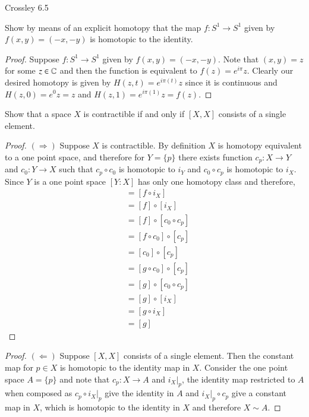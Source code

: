 \documentclass{homework651}
\begin{document}
\begin{problems}
\problem Crossley 6.5

Show by means of an explicit homotopy
that the map $f:S^1\rightarrow S^1$ given by $f(x,y)=(-x,-y)$
is homotopic to the identity.
\begin{proof} Suppose $f:S^1\rightarrow S^1$ given by $f(x,y)=(-x,-y)$. Note that $(x, y) = z$ for some $z \in \mathbb C$ 
    and then the function is equivalent to $f(z) = e^{i\pi}z$. Clearly our desired homotopy is given by $H(z, t) = e^{i\pi(t)}z$
    since it is continuous and $H(z, 0) = e^0z = z$ and $H(z, 1) = e^{i\pi(1)}z = f(z)$.     
\end{proof}







\problem Show that a space $X$ is contractible if and only if 
$[X,X]$ consists of a single element.
\begin{proof}$(\Rightarrow)$ Suppose $X$ is contractible. By definition $X$ is homotopy equivalent to a one point space, 
    and therefore for $Y = \{p\}$ there exists function $c_p: X \to Y$ and $c_0: Y \to X$ such that $c_p \circ c_0$ is homotopic to $i_{Y}$
    and $c_0 \circ c_p$ is homotopic to $i_X$. Since $Y$ is a one point space $[Y:X]$ has only one homotopy class and therefore, 
\begin{align*}
    [f]  &= [f \circ i_X]\\
          &= [f] \circ [i_X]\\
         &= [f] \circ [c_0 \circ c_p]\\
         &= [f \circ c_0] \circ [c_p]\\
         &= [c_0] \circ [c_p]\\
         &= [g \circ c_0] \circ [c_p]\\
         &= [g] \circ [c_0 \circ c_p]\\
         &= [g] \circ [i_X]\\
         &= [g \circ i_X]\\
         &= [g]
\end{align*}
    
\end{proof}


\begin{proof}$(\Leftarrow)$ Suppose $[X,X]$ consists of a single element. Then the constant map for $p \in X$ is homotopic to the
    identity map in $X$. Consider the one point space $A = \{p\}$ and note that $c_p: X \to A$ and $i_X|_p$, the identity map
    restricted to $A$ when composed 
    as $c_p \circ i_X|_p$ give the identity in $A$ and $i_X|_p \circ c_p$ give a constant map in $X$, which is homotopic to the identity in $X$
    and therefore $X \sim A$. 
\end{proof}



\end{problems}
\end{document}
